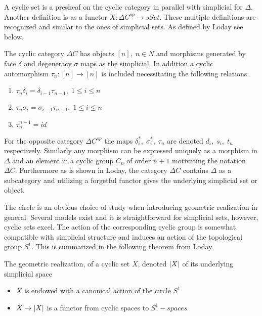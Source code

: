 \documentclass[../../main.tex]{subfiles}
\begin{document}
    A cyclic set is a presheaf on the cyclic category in parallel with  simplicial for $\Delta$. Another definition is as a functor $X:\Delta C^{op}\to sSet$. These multiple definitions are recognized and similar to the ones of simplicial sets. As defined by Loday see below.
    
    \begin{definition}
        The cyclic category $\Delta C$ has objects $[n], \;n\in N$ and morphisms generated by face $\delta$ and degeneracy $\sigma$ maps as the simplicial. In addition a cyclic automorphism $\tau_n:[n]\to [n]$ is included necessitating the following relations.
        \begin{enumerate}
            \item $\tau _n\delta_i=\delta_{i-1}\tau_{n-1},\; 1 \leq i\leq n$
            \item $\tau _n \sigma_i=\sigma_{i-1}\tau_{n+1},\; 1 \leq i\leq n$
            \item $\tau_{n}^{n+1}=id$
        \end{enumerate}
    \end{definition}

    For the opposite category $\Delta C^{op}$ the maps $\delta_i^*, \; \sigma_i^*,\;\tau_n$ are denoted $d_i,\; s_i, \; t_n$ respectively. Similarly any morphism can be expressed uniquely as a morphism in $\Delta$ and an element in a cyclic group $C_n$ of order $n+1$ motivating the notation $\Delta C$. Furthermore as is shown in Loday, the category $\Delta C$ contains $\Delta$ as a subcategory and utilizing a forgetful functor gives the underlying simplicial set or object. 

    The circle is an obvious choice of study when introducing geometric realization in general. Several models exist and it is straightforward for simplicial sets, however, cyclic sets excel. The action of the corresponding cyclic group is somewhat compatible with simplicial structure and induces an action of the topological group $S^1$. This is summarized in the following theorem from Loday.

    \begin{theorem}
        The geometric realization, of a cyclic set $X$, denoted $\geom[X]$ of its underlying simplicial space
        \begin{itemize}
            \item $X$ is endowed with a canonical action of the circle $S^1$
            \item $X \to \geom[X]$ is a functor from cyclic spaces to $S^1-spaces$
        \end{itemize}
    \end{theorem} %
\end{document}

